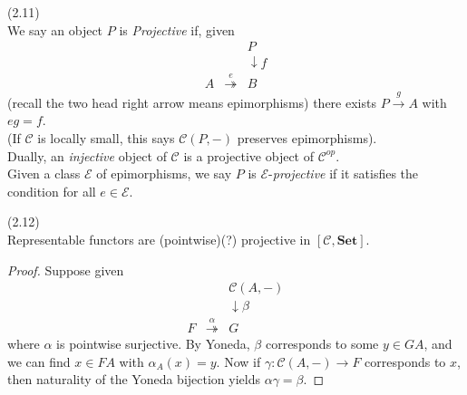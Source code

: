 \documentclass[a4paper]{article}
\begin{document}
\begin{defi} (2.11)\\
    We say an object $P$ is \emph{Projective} if, given 
    \begin{equation*}
        \begin{aligned}
            & & P\\
            & & \downarrow f\\
            A& \stackrel{e}{\twoheadrightarrow}& B
        \end{aligned}
    \end{equation*}
    (recall the two head right arrow means epimorphisms) there exists $P \xrightarrow{g} A$ with $eg = f$.\\
    (If $\mathcal{C}$ is locally small, this says $\mathcal{C}(P,-)$ preserves epimorphisms).\\
    Dually, an \emph{injective} object of $\mathcal{C}$ is a projective object of $\mathcal{C}^{op}$.\\
    Given a class $\mathcal{E}$ of epimorphisms, we say $P$ is $\mathcal{E}$-\emph{projective} if it satisfies the condition for all $e \in \mathcal{E}$.
\end{defi}

\begin{lemma} (2.12)\\
    Representable functors are (pointwise)(?) projective in $[\mathcal{C},\mathbf{Set}]$.
    \begin{proof}
        Suppose given 
        \begin{equation*}
            \begin{aligned}
                & & \mathcal{C}(A,-)\\
                & & \downarrow \beta\\
                F& \stackrel{\alpha}{\twoheadrightarrow}& G
            \end{aligned}
        \end{equation*}
        where $\alpha$ is pointwise surjective. By Yoneda, $\beta$ corresponds to some $y \in GA$, and we can find $x \in FA$ with $\alpha_A(x) = y$. Now if $\gamma:\mathcal{C}(A,-) \to F$ corresponds to $x$, then naturality of the Yoneda bijection yields $\alpha\gamma =\beta$.
    \end{proof}
\end{lemma}
\end{document}
